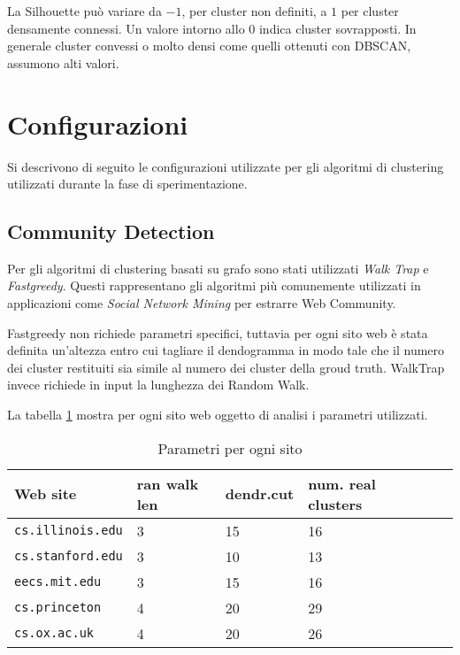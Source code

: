 La Silhouette può variare da $-1$, per cluster non definiti, a $1$ per cluster densamente connessi. Un valore intorno allo $0$ indica cluster sovrapposti. In generale cluster convessi o molto densi come quelli ottenuti con DBSCAN, assumono alti valori.
\section{Configurazioni}
Si descrivono di seguito le configurazioni utilizzate per gli algoritmi di clustering utilizzati durante la fase di sperimentazione. 

\subsection{Community Detection}
Per gli algoritmi di clustering basati su grafo sono stati utilizzati \textit{Walk Trap} e \textit{Fastgreedy}. Questi rappresentano gli algoritmi più comunemente utilizzati in applicazioni come \textit{Social Network Mining} per estrarre Web Community.

Fastgreedy non richiede parametri specifici, tuttavia per ogni sito web è stata definita un'altezza entro cui tagliare il dendogramma in modo tale che il numero dei cluster restituiti sia simile al numero dei cluster della groud truth. WalkTrap invece richiede in input la lunghezza dei Random Walk.



La tabella \ref{tabwebsites} mostra per ogni sito web oggetto di analisi i parametri utilizzati.

\begin{table}[]
\centering
\caption{Parametri per ogni sito}
\label{tabwebsites}
\begin{tabular}{|l|l|l|l|l|l|}
\hline
 \textbf{Web site}& \textbf{ran walk len} & \textbf{dendr.cut} & \textbf{num. real clusters}\\ \hline
\texttt{cs.illinois.edu}  & 3 &   15 & 16 \\ \hline
\texttt{cs.stanford.edu}& 3 & 10 & 13 \\ \hline
\texttt{eecs.mit.edu} & 3 & 15 & 16 \\ \hline
\texttt{cs.princeton} & 4 & 20 & 29 \\ \hline
\texttt{cs.ox.ac.uk} & 4 & 20 & 26 \\ \hline
\end{tabular}
\end{table}


